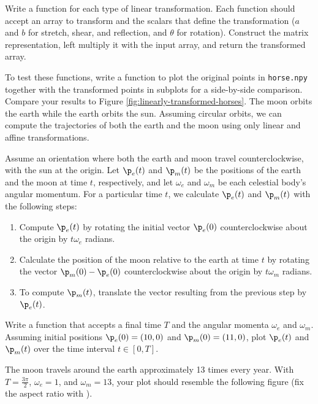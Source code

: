Write a function for each type of linear transformation.
Each function should accept an array to transform and the scalars that define the transformation ($a$ and $b$ for stretch, shear, and reflection, and $\theta$ for rotation).
Construct the matrix representation, left multiply it with the input array, and return the transformed array.

To test these functions, write a function to plot the original points in
\texttt{horse.npy} together with the transformed points in subplots for a side-by-side comparison.
Compare your results to Figure \ref{fig:linearly-transformed-horses}.
\label{prob:implement-linear-transformations}
The moon orbits the earth while the earth orbits the sun.
Assuming circular orbits, we can compute the trajectories of both the earth and the moon using only linear and affine transformations.

Assume an orientation where both the earth and moon travel counterclockwise, with the sun at the origin.
Let $\p_e(t)$ and $\p_m(t)$ be the positions of the earth and the moon at time $t$, respectively, and let $\omega_e$ and $\omega_m$ be each celestial body's angular momentum.
For a particular time $t$, we calculate $\p_e(t)$ and $\p_m(t)$ with the following steps:

\begin{enumerate}
\item Compute $\p_e(t)$ by rotating the initial vector $\p_e(0)$ counterclockwise about the origin by $t\omega_e$ radians.
\item Calculate the position of the moon relative to the earth at time $t$ by rotating the vector $\p_m(0) - \p_e(0)$ counterclockwise about the origin by $t\omega_m$ radians.
\item To compute $\p_m(t)$, translate the vector resulting from the previous step by $\p_e(t)$.
\end{enumerate}

Write a function that accepts a final time $T$ and the angular momenta $\omega_e$ and $\omega_m$.
Assuming initial positions $\p_e(0) = (10,0)$ and $\p_m(0) = (11,0)$, plot $\p_e(t)$ and $\p_m(t)$ over the time interval $t \in [0, T]$.

The moon travels around the earth approximately 13 times every year.
With $T = \frac{3\pi}{2}$, $\omega_e = 1$, and $\omega_m = 13$, your plot should resemble the following figure (fix the aspect ratio with ).

